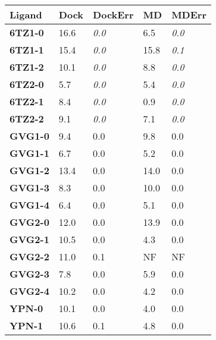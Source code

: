 \documentclass[journal=jcisd8,manuscript=article]{achemso}
\begin{document}
\begin{table}[]
\begin{tabular}{|l|l|l|l|l|}
\hline
\textbf{Ligand} & \textbf{Dock} & \textbf{DockErr} & \textbf{MD} & \textbf{MDErr} \\ \hline
\textbf{6TZ1-0} & 16.6          & \textit{0.0}     & 6.5         & \textit{0.0}   \\ \hline
\textbf{6TZ1-1} & 15.4          & \textit{0.0}     & 15.8        & \textit{0.1}   \\ \hline
\textbf{6TZ1-2} & 10.1          & \textit{0.0}     & 8.8         & \textit{0.0}   \\ \hline
\textbf{6TZ2-0} & 5.7           & \textit{0.0}     & 5.4         & \textit{0.0}   \\ \hline
\textbf{6TZ2-1} & 8.4           & \textit{0.0}     & 0.9         & \textit{0.0}   \\ \hline
\textbf{6TZ2-2} & 9.1           & \textit{0.0}     & 7.1         & \textit{0.0}   \\ \hline
\textbf{GVG1-0} & 9.4           & 0.0              & 9.8         & 0.0            \\ \hline
\textbf{GVG1-1} & 6.7           & 0.0              & 5.2         & 0.0            \\ \hline
\textbf{GVG1-2} & 13.4          & 0.0              & 14.0        & 0.0            \\ \hline
\textbf{GVG1-3} & 8.3           & 0.0              & 10.0        & 0.0            \\ \hline
\textbf{GVG1-4} & 6.4           & 0.0              & 5.1         & 0.0            \\ \hline
\textbf{GVG2-0} & 12.0          & 0.0              & 13.9        & 0.0            \\ \hline
\textbf{GVG2-1} & 10.5          & 0.0              & 4.3         & 0.0            \\ \hline
\textbf{GVG2-2} & 11.0          & 0.1              & NF          & NF             \\ \hline
\textbf{GVG2-3} & 7.8           & 0.0              & 5.9         & 0.0            \\ \hline
\textbf{GVG2-4} & 10.2          & 0.0              & 4.2         & 0.0            \\ \hline
\textbf{YPN-0}  & 10.1          & 0.0              & 4.0         & 0.0            \\ \hline
\textbf{YPN-1}  & 10.6          & 0.1              & 4.8         & 0.0            \\ \hline

\end{tabular}
\end{table}
\end{document}

